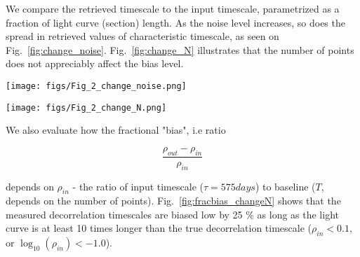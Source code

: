 \documentclass[fleqn,usenatbib]{mnras}  %
\begin{document}
 

We compare the retrieved timescale to the input timescale, parametrized as a fraction of light curve (section) length. As the noise level increases, so does the spread in retrieved values of characteristic timescale, as seen on Fig.~\ref{fig:change_noise}.  Fig.~\ref{fig:change_N} illustrates  that the number of points does not appreciably affect the bias level.

\begin{figure*}
\texttt{[image: figs/Fig\_2\_change\_noise.png]}
\caption{We plot the histogram of input to output $\rho$, and overplot the median of counts in bins of $\log_{10}{(\rho_{in})}$. The red dashed line marks the expected output in case of perfect fit.  We see  that indeed for light curves less than ~10 times the length of characteristic timescale the retrieved timescale is biased low. Increasing the number of points per lightcurve decreases the vertical scatter, i.e. decreases the rms of $\rho_{out}$ in bins of $\rho_{in}$.  We find that random vs regular sampling does not affect the plot morphology, thus we only show the random sampling.  On this plot, from left to right, we increase the photometric error from 0.001 to 0.1, keeping the number of points fixed at 1000. }
\label{fig:change_noise}
\end{figure*} 


\begin{figure*}
\texttt{[image: figs/Fig\_2\_change\_N.png]}
\caption{Similarly to Fig.~\ref{fig:change_noise}, but keeping noise fixed at 0.001 mag level , random sampling , and decreasing from left to right the number of points from 1000 to 60. }
\label{fig:change_N}
\end{figure*} 

We also evaluate how the fractional "bias", i.e ratio 

\begin{equation}
\frac{\rho_{out}-\rho_{in}}{\rho_{in}}
\end{equation}

depends on $\rho_{in}$ -  the ratio of input timescale ($\tau=575 days$) to baseline ($T$, depends on the number of points).
Fig.~\ref{fig:fracbias_changeN} shows that the measured decorrelation timescales are biased low by 25 \%  as long as the light curve is at least 10 times longer than the true decorrelation timescale ($\rho_{in} < 0.1 $, or $\log_{10}(\rho_{in}) < -1.0$). 
\end{document}
